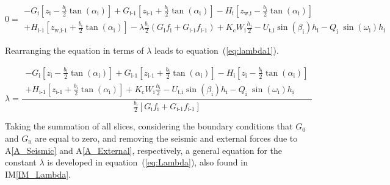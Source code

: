 \documentclass[12pt]{article}
\newcommand{\aref}[1]{A\ref{#1}}
\newcommand{\iref}[1]{IM\ref{#1}}
\begin{document}
\begin{equation}\label{eq:Moment}
  0 = \begin{array}{l} - {G}_{\text{i}} \left[ {z_{\text{i}}} -
      \frac{b_{\text{i}}}{2} { \tan\left(\alpha_{\text{i}}\right)}
      \right] + {G}_{\text{i-1}} \left[ {z_{\text{i-1}}} +
      \frac{b_{\text{i}}}{2} { \tan\left(\alpha_{\text{i}}\right)}
      \right] - H_{\text{i}}\left[ z_{\text{w,i}} -
      \frac{b_{\text{i}}}{2} { \tan\left(\alpha_{\text{i}}\right)}
      \right] \\[5pt] + H_{\text{i-1}}\left[ z_{\text{w,i-1}} +
      \frac{b_{\text{i}}}{2} { \tan\left(\alpha_{\text{i}}\right)}
      \right] -\lambda \frac{b_{\text{i}}}{2} \left( G_{\text{i}}
    f_{\text{i}} + G_{\text{i-1}} f_{\text{i-1}} \right) +
    K_{\text{c}} W_{\text{i}} \frac{h_{\text{i}}}{2} - U_{\text{t,i}}
    \sin\left(\beta_{\text{i}}\right) h_{\text{i}} -
    Q_{\text{i}}\;{\sin\left(\omega_{\text{i}}\right)}
    h_{\text{i}} \end{array}
\end{equation} 

\noindent
Rearranging the equation in terms of $\lambda$ leads to 
equation~(\ref{eq:lambda1}).

\begin{equation}\label{eq:lambda1}
  \lambda = \frac { \begin{array}{l} - {G}_{\text{i}} \left[
        {z_{\text{i}}} - \frac{b_{\text{i}}}{2} {
          \tan\left(\alpha_{\text{i}}\right)} \right] +
      {G}_{\text{i-1}} \left[ {z_{\text{i-1}}} +
        \frac{b_{\text{i}}}{2} { \tan\left(\alpha_{\text{i}}\right)}
        \right] - H_{\text{i}}\left[ z_{\text{i}} -
        \frac{b_{\text{i}}}{2} { \tan\left(\alpha_{\text{i}}\right)}
        \right] \\[5pt] + H_{\text{i-1}}\left[ z_{\text{i-1}} +
        \frac{b_{\text{i}}}{2} { \tan\left(\alpha_{\text{i}}\right)}
        \right] + K_{\text{c}} W_{\text{i}} \frac{h_{\text{i}}}{2} -
      U_{\text{t,i}} \sin\left(\beta_{\text{i}}\right) h_{\text{i}} -
      Q_{\text{i}}\;{\sin\left(\omega_{\text{i}}\right)}
      h_{\text{i}} \end{array} } { \frac{b_{\text{i}}}{2} \left[
      G_{\text{i}} f_{\text{i}} + G_{\text{i-1}} f_{\text{i-1}}
      \right] }
\end{equation}

\noindent
Taking the summation of all slices, considering the boundary
conditions that $G_{\text{0}}$ and $G_{\text{n}}$ are equal to zero, and 
removing the seismic and external forces due to \aref{A_Seismic} and 
\aref{A_External}, respectively, a general equation for the constant $\lambda$ 
is developed in equation~(\ref{eq:Lambda}), also found in \iref{IM_Lambda}.
\end{document}
